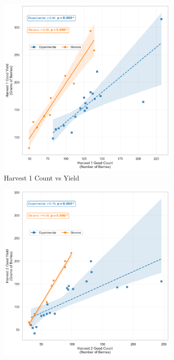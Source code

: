 \begin{figure}[!ht]
  \begin{subfigure}{0.45\textwidth}
    \includegraphics[width=\textwidth]{images/h1-countvsyield.png}
   \caption{Harvest 1 Count vs Yield}
    \label{fig:H1 Count vs Yield}
  \end{subfigure}
  \hfill
  \begin{subfigure}{0.45\textwidth}
    \includegraphics[width=\textwidth]{images/h2-countvsyield.png}

\end{subfigure}
\end{figure}
